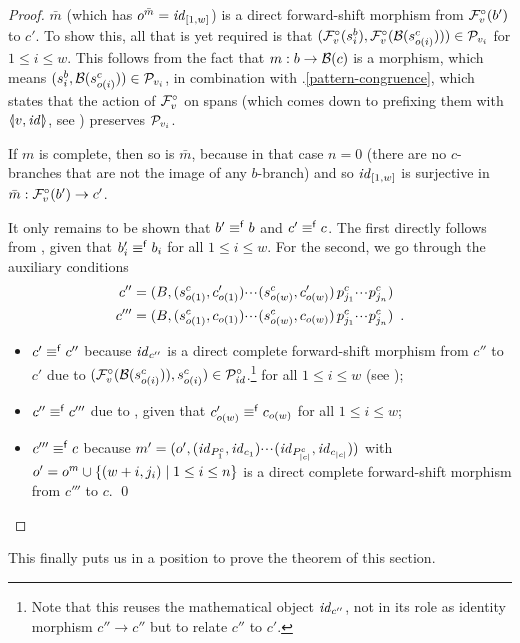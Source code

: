 \begin{proof}
\smallskip
$\bar m$ (which has $o^{\bar m}=\mathit{id}_{[1,w]}$) is a direct forward-shift morphism from $\mathcal{F}^\circ_{v}(b')$ to $c'$. To show this, all that is yet required is that $(\mathcal{F}^\circ_{v}(s^b_i),\mathcal{F}^\circ_{v}(\mathcal{B}(s^c_{o(i)}))) \in \mathcal{P}_{v_i}$ for $1\leq i\leq w$. This follows from the fact that $m:b\rightarrow \mathcal{B}(c)$ is a morphism, which means $(s^b_i,\mathcal{B}(s^c_{o(i)}))\in \mathcal{P}_{v_i}$, in combination with .\ref{pattern-congruence}, which states that the action of $\mathcal{F}^\circ_{v}$ on spans (which comes down to prefixing them with $\spanof{v}{\id}$, see ) preserves $\mathcal{P}_{v_i}$.

\smallskip
If $m$ is complete, then so is $\bar m$, because in that case $n=0$ (there are no $c$-branches that are not the image of any $b$-branch) and so $\mathit{id}_{[1,w]}$ is surjective in $\bar m:\mathcal{F}^\circ_{v}(b')\rightarrow c'$.

\smallskip
It only remains to be shown that $b'\equiv^{\mathsf f} b$ and $c'\equiv^{\mathsf f} c$. The first directly follows from , given that $b'_i\equiv^{\mathsf f} b_i$ for all $1\leq i\leq w$. For the second, we go through the auxiliary conditions
\begin{align*}
c''=\;&(B,(s^c_{o(1)},c'_{o(1)}){\cdotp\mkern-2mu\cdotp\mkern-2mu\cdotp\mkern1mu} (s^c_{o(w)},c'_{o(w)})\,p^c_{j_1}{\cdotp\mkern-2mu\cdotp\mkern-2mu\cdotp\mkern1mu} p^c_{j_n}) \\
c'''=\;&(B,(s^c_{o(1)},c_{o(1)}){\cdotp\mkern-2mu\cdotp\mkern-2mu\cdotp\mkern1mu} (s^c_{o(w)},c_{o(w)})\,p^c_{j_1}{\cdotp\mkern-2mu\cdotp\mkern-2mu\cdotp\mkern1mu} p^c_{j_n}) \enspace.
\end{align*}
\begin{itemize}
\item $c'\equiv^{\mathsf f} c''$ because $\mathit{id}_{c''}$ is a direct complete forward-shift morphism from $c''$ to $c'$ due to $(\mathcal{F}^\circ_{v}(\mathcal{B}(s^c_{o(i)})),s^c_{o(i)})\in \mathcal{P}^\circ_{\mathit{id}}$.\footnote{Note that this reuses the mathematical object $\mathit{id}_{c''}$, not in its role as identity morphism $c''\to c''$ but to relate $c''$ to $c'$.}  for all $1\leq i\leq w$ (see );

\item $c''\equiv^{\mathsf f} c'''$ due to , given that $c'_{o(w)}\equiv^{\mathsf f} c_{o(w)}$ for all $1\leq i\leq w$; 

\item $c'''\equiv^{\mathsf f} c$ because $m'=(o',(\mathit{id}_{P^c_1},\mathit{id}_{c_1}){\cdotp\mkern-2mu\cdotp\mkern-2mu\cdotp\mkern1mu} (\mathit{id}_{P^c_{|c|}},\mathit{id}_{c_{|c|}}))$ with $o'=o^m\cup\{{(w+i,j_i) \mid 1\leq i\leq n}\}$ is a direct complete forward-shift morphism from $c'''$ to $c$.
\qed
\end{itemize}
\end{proof}
%
This finally puts us in a position to prove the theorem of this section.

